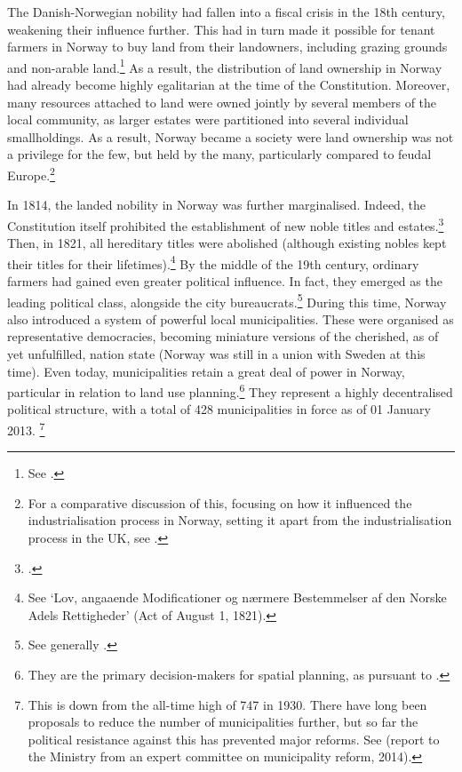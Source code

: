 The Danish-Norwegian nobility had fallen into a fiscal crisis in the 18th century, weakening their influence further. This had in turn made it possible for tenant farmers in Norway to buy land from their landowners, including grazing grounds and non-arable land.\footnote{See \cite[59-60]{pryser99}.} As a result, the distribution of land ownership in Norway had already become highly egalitarian at the time of the Constitution. Moreover, many resources attached to land were owned jointly by several members of the local community, as larger estates were partitioned into several individual smallholdings. As a result, Norway became a society were land ownership was not a privilege for the few, but held by the many, particularly compared to feudal Europe.\footnote{For a comparative discussion of this, focusing on how it influenced the industrialisation process in Norway, setting it apart from the industrialisation process in the UK, see \cite{brox13}.}

In 1814, the landed nobility in Norway was further marginalised. Indeed, the Constitution itself prohibited the establishment of new noble titles and estates.\footcite[23|118]{c14} Then, in 1821, all hereditary titles were abolished (although existing nobles kept their titles for their lifetimes).\footnote{See `Lov, angaaende Modificationer og nærmere Bestemmelser af den Norske Adels Rettigheder' (Act of August 1, 1821).} By the middle of the 19th century, ordinary farmers had gained even greater political influence. In fact, they emerged as the leading political class, alongside the city bureaucrats.\footnote{See generally \cite{hommerstad14}.} During this time, Norway also introduced a system of powerful local municipalities. These were organised as representative democracies, becoming miniature versions of the cherished, as of yet unfulfilled, nation state (Norway was still in a union with Sweden at this time). Even today, municipalities retain a great deal of power in Norway, particular in relation to land use planning.\footnote{They are the primary decision-makers for spatial planning, as pursuant to \cite{pb08}.} They represent a highly decentralised political structure, with a total of 428 municipalities in force as of 01 January 2013. \footnote{This is down from the all-time high of 747 in 1930. There have long been proposals to reduce the number of municipalities further, but so far the political resistance against this has prevented major reforms. See \cite{kommuner14} (report to the Ministry from an expert committee on municipality reform, 2014).}

